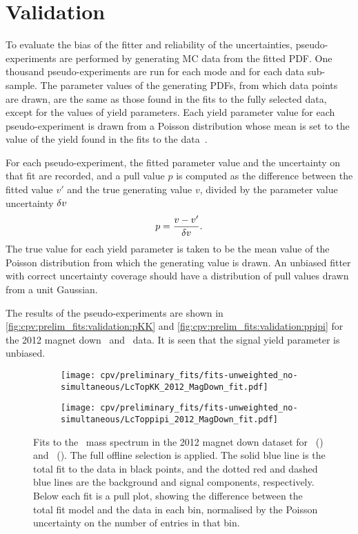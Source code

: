 \section{Validation}
\label{chap:cpv:prelim_fits:validation}

To evaluate the bias of the fitter and reliability of the uncertainties,
pseudo-experiments are performed by generating \ac{MC} data from the fitted
\ac{PDF}.
One thousand pseudo-experiments are run for each mode and for each data
sub-sample.
The parameter values of the generating \acp{PDF}, from which data points are
drawn, are the same as those found in the fits to the fully selected data,
except for the values of yield parameters.
Each yield parameter value for each pseudo-experiment is drawn from a Poisson
distribution whose mean is set to the value of the yield found in the fits to
the data~\cite{Karbach:2012vg}.

For each pseudo-experiment, the fitted parameter value and the uncertainty on
that fit are recorded, and a pull value $p$ is computed as the difference
between the fitted value $v'$ and the true generating value $v$, divided by the
parameter value uncertainty $\delta{v}$
\begin{equation}
  p = \frac{v - v'}{\delta{v}}.
\end{equation}
The true value for each yield parameter is taken to be the mean value of the
Poisson distribution from which the generating value is drawn.
An unbiased fitter with correct uncertainty coverage should have a distribution
of pull values drawn from a unit Gaussian.

The results of the pseudo-experiments are shown in
\cref{fig:cpv:prelim_fits:validation:pKK} and
\cref{fig:cpv:prelim_fits:validation:ppipi} for the 2012 magnet down \pKK\ and
\ppipi\ data.
It is seen that the signal yield parameter is unbiased.

\begin{figure}
  \begin{subfigure}[b]{0.5\textwidth}
    \texttt{[image: cpv/preliminary\_fits/fits-unweighted\_no-simultaneous/LcTopKK\_2012\_MagDown\_fit.pdf]}
    \caption{\pKK}
    \label{fig:cpv:prelim_fits:full:pKK}
  \end{subfigure}
  \begin{subfigure}[b]{0.5\textwidth}
    \texttt{[image: cpv/preliminary\_fits/fits-unweighted\_no-simultaneous/LcToppipi\_2012\_MagDown\_fit.pdf]}
    \caption{\ppipi}
    \label{fig:cpv:prelim_fits:full:ppipi}
  \end{subfigure}
  \caption{%
    Fits to the \PLambdac\ mass spectrum in the 2012 magnet down dataset for
    \pKK~() and
    \ppipi~().
    The full offline selection is applied.
    The solid blue line is the total fit to the data in black points, and the
    dotted red and dashed blue lines are the background and signal components,
    respectively.
    Below each fit is a pull plot, showing the difference between the total fit
    model and the data in each bin, normalised by the Poisson uncertainty on
    the number of entries in that bin.
  }
  \label{fig:cpv:prelim_fits:full}
\end{figure}

